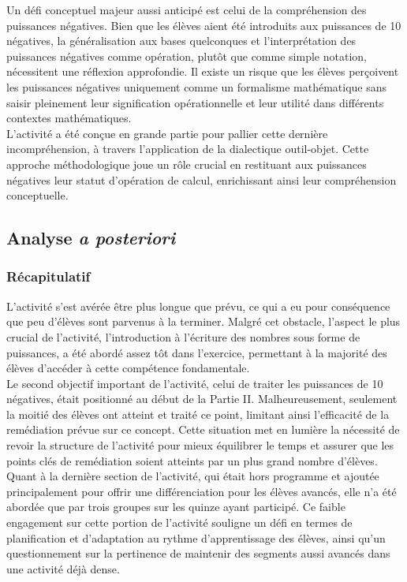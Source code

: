 Un défi conceptuel majeur aussi anticipé est celui de la compréhension des puissances négatives.
Bien que les élèves aient été introduits aux puissances de 10 négatives,
la généralisation aux bases quelconques et l'interprétation des puissances négatives comme opération,
plutôt que comme simple notation,
nécessitent une réflexion approfondie.
Il existe un risque que les élèves perçoivent les puissances négatives uniquement comme un formalisme mathématique sans saisir pleinement leur signification opérationnelle et leur utilité dans différents contextes mathématiques.\\

L'activité a été conçue en grande partie pour pallier cette dernière incompréhension,
à travers l'application de la dialectique outil-objet.
Cette approche méthodologique joue un rôle crucial en restituant aux puissances négatives leur statut d'opération de calcul,
enrichissant ainsi leur compréhension conceptuelle.

\subsection{Analyse \textit{a posteriori}}
\subsubsection{Récapitulatif}
L'activité s'est avérée être plus longue que prévu,
ce qui a eu pour conséquence que peu d'élèves sont parvenus à la terminer.
Malgré cet obstacle,
l'aspect le plus crucial de l'activité,
l'introduction à l'écriture des nombres sous forme de puissances,
a été abordé assez tôt dans l'exercice,
permettant à la majorité des élèves d'accéder à cette compétence fondamentale.\\

Le second objectif important de l'activité,
celui de traiter les puissances de 10 négatives,
était positionné au début de la Partie II.
Malheureusement,
seulement la moitié des élèves ont atteint et traité ce point,
limitant ainsi l'efficacité de la remédiation prévue sur ce concept.
Cette situation met en lumière la nécessité de revoir la structure de l'activité pour mieux équilibrer le temps et assurer que les points clés de remédiation soient atteints par un plus grand nombre d'élèves.\\

Quant à la dernière section de l'activité,
qui était hors programme et ajoutée principalement pour offrir une différenciation pour les élèves avancés,
elle n'a été abordée que par trois groupes sur les quinze ayant participé.
Ce faible engagement sur cette portion de l'activité souligne un défi en termes de planification et d'adaptation au rythme d'apprentissage des élèves,
ainsi qu'un questionnement sur la pertinence de maintenir des segments aussi avancés dans une activité déjà dense.

